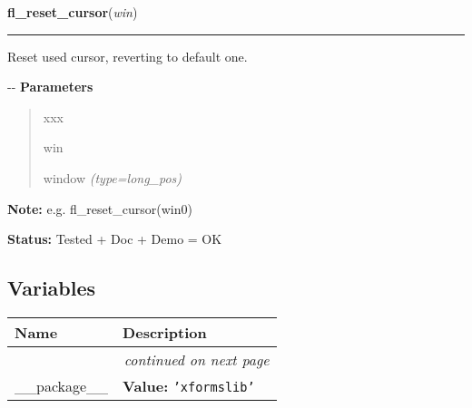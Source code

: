 \hspace{.8\funcindent}\begin{boxedminipage}{\funcwidth}

    \raggedright \textbf{fl\_reset\_cursor}(\textit{win})

    \vspace{-1.5ex}

    \rule{\textwidth}{0.5\fboxrule}
\setlength{\parskip}{2ex}

Reset used cursor, reverting to default one.

-{}-
\setlength{\parskip}{1ex}
      \textbf{Parameters}
      \vspace{-1ex}

      \begin{quote}
        \begin{Ventry}{xxx}

          \item[win]


window
            {\it (type=long\_pos)}

        \end{Ventry}

      \end{quote}

\textbf{Note:} 
e.g. fl\_reset\_cursor(win0)


\textbf{Status:} 
Tested + Doc + Demo = OK


    \end{boxedminipage}



  \subsection{Variables}

    \vspace{-1cm}
\hspace{\varindent}\begin{longtable}{|p{\varnamewidth}|p{\vardescrwidth}|l}
\cline{1-2}
\cline{1-2} \centering \textbf{Name} & \centering \textbf{Description}& \\
\cline{1-2}
\endhead\cline{1-2}\multicolumn{3}{r}{\small\textit{continued on next page}}\\\endfoot\cline{1-2}
\endlastfoot\raggedright \_\-\_\-p\-a\-c\-k\-a\-g\-e\-\_\-\_\- & \raggedright \textbf{Value:} 
{\tt \texttt{'}\texttt{xformslib}\texttt{'}}&\\
\cline{1-2}
\end{longtable}

